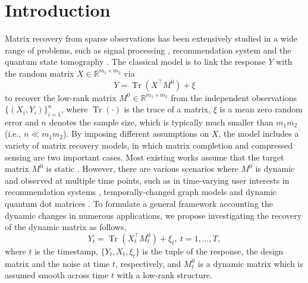 \documentclass[12pt]{article}
\newtheorem{emp}{Example}
\def\Tr{\operatorname{Tr}}
\begin{document}
\section{Introduction}
\label{intro}
  Matrix recovery from sparse observations has been extensively studied in a wide range of problems, such as signal processing \citep{li2019survey}, recommendation system \citep{koren2009matrix} and the quantum state tomography \citep{gross2010quantum}. The classical model is to link the response $Y$ with the random matrix $X\in\mathbb{R}^{m_1\times m_2}$ via
  \begin{equation}\label{eq:static model 0}
      Y = \Tr(X^\top M^0) + \xi
  \end{equation}
  to recover the low-rank matrix $M^0\in\mathbb{R}^{m_1\times m_2}$ from the independent observations $\{(X_i,Y_i)\}_{i=1}^n$, where $\Tr(\cdot)$ is the trace of a matrix, $\xi$ is a mean zero random error and $n$ denotes the sample size, which is typically much smaller than $m_1 m_2$ (i.e., $n \ll m_1 m_2$). By imposing different assumptions
on $X$, the model includes a variety of matrix recovery models, in which matrix completion and compressed sensing are two important cases.
  Most existing works assume that the target matrix $M^0$ is static \citep{klopp2011rank,koltchinskii2015optimal,fan2021shrinkage,xia_statistical_2021}. 
  However, there are various scenarios where $M^0$ is dynamic and observed at multiple time points,
  such as in time-varying user interests in recommendation systems \citep{xu2020contextual}, temporally-changed graph models \citep{qiu2017time} and dynamic quantum dot matrices \citep{csurgay2000signal}. 
  To formulate a general framework accounting the dynamic changes in numerous applications, we propose investigating the recovery of the dynamic matrix as follows,
  \begin{equation}\label{eq:dynamic model 0}
      Y_t = \Tr(X_t^\top M_t^0) + \xi_t,\ t=1,\ldots,T,
  \end{equation}
  where $t$ is the timestamp, $\{Y_t,X_t,\xi_t\}$ is the tuple of the response, the design matrix and the noise at time $t$, respectively, and $M_t^0$ is a dynamic matrix which is assumed smooth across time $t$ with a low-rank structure. 
\end{document}
